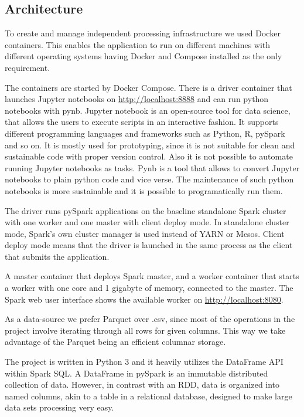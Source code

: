 \subsection{Architecture}
To create and manage independent processing infrastructure we used Docker containers. This enables the application to run on different machines with different operating systems having Docker and Compose installed as the only requirement. 

The containers are started by Docker Compose. There is a driver container that launches Jupyter notebooks on \url{http://localhost:8888} and can run python notebooks with pynb. 
Jupyter notebook is an open-source tool for data science, that allows the users to execute scripts in an interactive fashion. It supports different programming languages and frameworks such as Python, R, pySpark and so on. It is mostly used for prototyping, since it is not suitable for clean and sustainable code with proper version control. Also it is not possible to automate running Jupyter notebooks as tasks. 
Pynb is a tool that allows to convert Jupyter notebooks to plain python code and vice verse. The maintenance of such python notebooks is more sustainable and it is possible to programatically run them. \cite{pynb}

The driver runs pySpark applications on the baseline standalone Spark cluster with one worker and one master with client deploy mode. In standalone cluster mode, Spark's own cluster manager is used instead of YARN or Mesos. Client deploy mode means that  the driver is launched in the same process as the client that submits the application. 

A master container that deploys Spark master, and a worker container that starts a worker with one core and 1 gigabyte of memory, connected to the master. The Spark web user interface shows the available worker on \url{http://localhost:8080}.

As a data-source we prefer Parquet over .csv, since most of the operations in the project involve iterating through all rows for given columns. This way we take advantage of the Parquet being an efficient columnar storage.

The project is written in Python 3 and it heavily utilizes the DataFrame API within Spark SQL. A DataFrame in pySpark is an immutable distributed collection of data. However, in contrast with an RDD, data is organized into named columns, akin to a table in a relational database, designed to make large data sets processing very easy.

